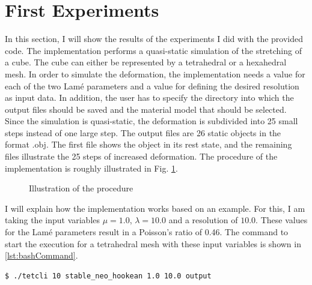 \section{First Experiments}
In this section, I will show the results of the experiments I did with the provided code. The implementation performs a quasi-static simulation of the stretching of a cube. The cube can either be represented by a tetrahedral or a hexahedral mesh. In order to simulate the deformation, the implementation needs a value for each of the two Lamé parameters and a value for defining the desired resolution as input data. In addition, the user has to specify the directory into which the output files should be saved and the material model that should be selected. Since the simulation is quasi-static, the deformation is subdivided into 25 small steps instead of one large step. The output files are 26 static objects in the format .obj. The first file shows the object in its rest state, and the remaining files illustrate the 25 steps of increased deformation. The procedure of the implementation is roughly illustrated in Fig. \ref{fig:procedure}.
\begin{figure}[!htb]
\centering
{}
\caption{Illustration of the procedure} \label{fig:procedure}
\end{figure}

I will explain how the implementation works based on an example. For this, I am taking the input variables $\mu = 1.0$, $\lambda = 10.0$ and a resolution of $10.0$. These values for the Lamé parameters result in a Poisson's ratio of 0.46. The command to start the execution for a tetrahedral mesh with these input variables is shown in \autoref{lst:bashCommand}.
\newline
\begin{lstlisting}[language=bash, numbers=none, label=lst:bashCommand, caption=Bash command for executing the code, captionpos=b]
$ ./tetcli 10 stable_neo_hookean 1.0 10.0 output
\end{lstlisting}

